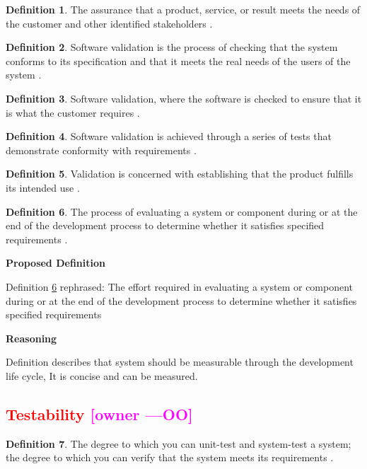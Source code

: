 \documentclass[letterpaper,cleveref]{lipics-v2019}
\newcommand{\authornote}[3]{\textcolor{#1}{[#3 ---#2]}}
\newcommand{\authornote}[3]{}
\newcommand{\oo}[1]{\authornote{magenta}{OO}{#1}} %
\newcommand{\notdone}[1]{\textcolor{red}{#1}}
\theoremstyle{definition}
\newtheorem{defn}{Definition}
\begin{document}
\begin{defn}
  The assurance that a product, service, or result meets the needs of the customer and other identified
  stakeholders \citep{project2017guide}.
\end{defn}
\begin{defn}
	Software validation is the process of checking that the system conforms to its specification and
	that it meets the real needs of the users of the system \citep{sommerville}.
	
\end{defn}
\begin{defn}
	Software validation, where the software is checked to ensure that it is what the
	customer requires \citep{sommerville}.
\end{defn}
\begin{defn}
  Software validation is achieved through a series of tests that demonstrate conformity
  with requirements \citep{pressman2005software}.
\end{defn}

\begin{defn}
	Validation is concerned with establishing that the product fulfills its
	intended use \citep{van2008software}.
\end{defn}

\begin{defn} \label{Defn_Validatability}
  The process of evaluating a system or component during or at the end of the
  development process to determine whether it satisfies specified requirements
  \citep{IEEEStdGlossarySET1990}.
\end{defn}

\noindent \textbf{Proposed Definition}

Definition \ref{Defn_Validatability} rephrased:  The effort required in evaluating
a system or component during or at the end of the development process to determine
whether it satisfies specified requirements

\noindent \textbf{Reasoning}

Definition describes that system should be measurable through the development life cycle,
It is concise and can be measured.
\subsection{\notdone{Testability} \oo{owner}}

\begin{defn}
	The degree to which you can unit-test and system-test a system;
	the degree to which you can verify that the system meets its requirements \citep{mcconnell2004code}.
\end{defn}
\end{document}
